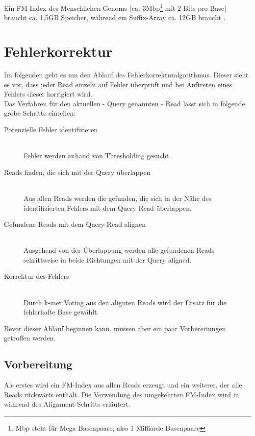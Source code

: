 Ein FM-Index des Menschlichen Genoms (ca. 3Mbp\footnote{Mbp steht für Mega Basenpaare, also 1 Milliarde Basenpaare} mit 2 Bits pro Base) braucht ca. 1,5GB Speicher, während ein Suffix-Array ca. 12GB braucht \cite{FmIndexLecture}.

\section{Fehlerkorrektur}
\label{sec:methodik-fehlerkorrektur}

Im folgenden geht es um den Ablauf des Fehlerkorrekturalgorithmus.
Dieser sieht es vor, dass jeder Read einzeln auf Fehler überprüft und bei Auftreten eines Fehlers dieser korrigiert wird.\\
Das Verfahren für den aktuellen - Query genannten - Read lässt sich in folgende grobe Schritte einteilen:

\begin{description}
	\item[Potenzielle Fehler identifizieren]\hfill\\
		Fehler werden anhand von Thresholding gesucht.
	\item[Reads finden, die sich mit der Query überlappen]\hfill\\
		Aus allen Reads werden die gefunden, die sich in der Nähe des identifizierten Fehlers mit dem Query Read überlappen.
	\item[Gefundene Reads mit dem Query-Read alignen]\hfill\\
		Ausgehend von der Überlappung werden alle gefundenen Reads schrittweise in beide Richtungen mit der Query aligned.
	\item[Korrektur des Fehlers]\hfill\\
		Durch k-mer Voting aus den alignten Reads wird der Ersatz für die fehlerhafte Base gewählt.
\end{description}

Bevor dieser Ablauf beginnen kann, müssen aber ein paar Vorbereitungen getroffen werden.


\subsection{Vorbereitung}
\label{subsec:vorbereitung}

Als erstes wird ein FM-Index aus allen Reads erzeugt und ein weiterer, der alle Reads rückwärts enthält.
Die Verwendung des umgekehrten FM-Index wird in während des Alignment-Schritts erläutert.

